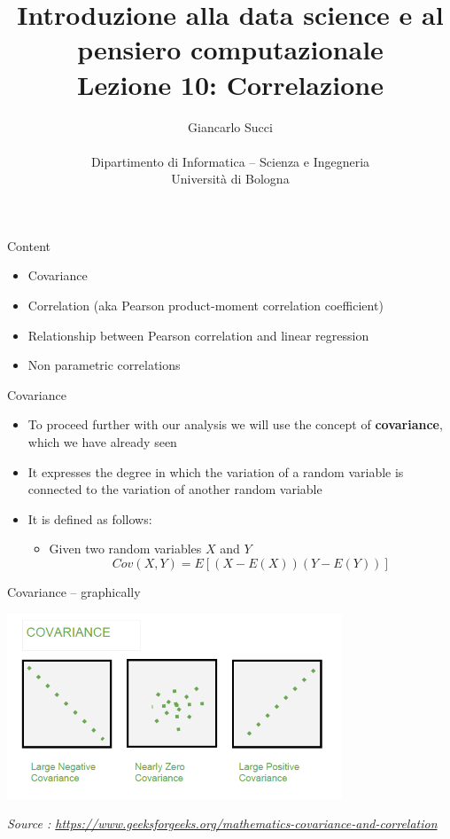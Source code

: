\documentclass{beamer}
\title[L02]{Introduzione alla data science e al pensiero computazionale\\
Lezione 10: Correlazione} %
\author[{\tiny Giancarlo Succi }]{Giancarlo Succi\\\\ Dipartimento di Informatica -- Scienza e Ingegneria\\Universit\`{a} di Bologna\\
\bftt{g.succi@unibo.it}
} %
\institute[unibo] %
\date{} %
\begin{document}
\begin{frame}
\titlepage %

\end{frame}

\begin{frame}
{\centerline{Content}}

\begin{itemize}
\item Covariance
\item Correlation (aka Pearson product-moment correlation coefficient)
\item Relationship between Pearson correlation and linear regression
\item Non parametric correlations
\end{itemize}
\end{frame}


\begin{frame}
{\centerline{Covariance}}

\begin{itemize}
\item To proceed further with our analysis we will use the concept of \textbf{covariance}, which we have already seen
\item It expresses the degree in which the variation of a random variable is connected to the variation of another random variable
\item It is defined as follows:
\begin{itemize}
\item Given two random variables $X$ and $Y$
$$Cov(X,Y) = E[ (X - E(X))(Y - E(Y))]$$
\end{itemize}
\end{itemize}

\end{frame}


\begin{frame}
{\centerline{Covariance -- graphically}}


\begin{center}
\includegraphics[width=10cm]{A2022.IDSEPC.Correlazione/Covar.png}
\end{center} 
\textit{\small
Source : \url{https://www.geeksforgeeks.org/mathematics-covariance-and-correlation}}
\end{frame}
\end{document}
